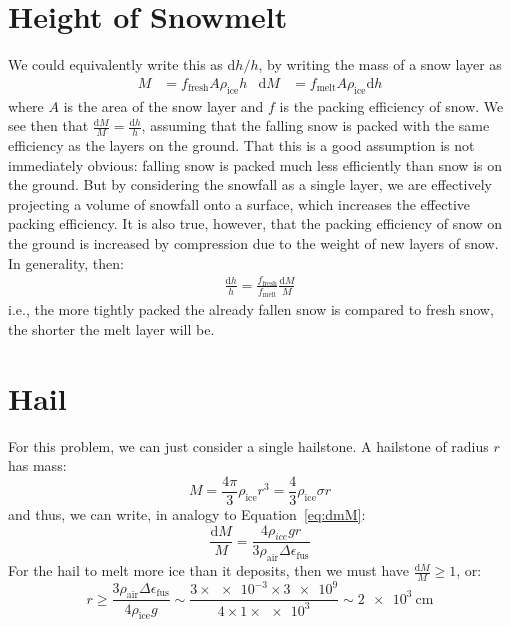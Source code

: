 \documentclass{article}
\begin{document}
    \section{Height of Snowmelt}
    We could equivalently write this as d$h/h$, by writing the mass of a snow layer as
    \begin{align}
        M &= f_\mathrm{fresh}A\rho_\mathrm{ice}h & \mathrm{d}M &= f_\mathrm{melt}A\rho_\mathrm{ice}\mathrm{d}h
    \end{align}
    where $A$ is the area of the snow layer and $f$ is the packing efficiency of snow.  We see then that $\frac{\mathrm{d}M}{M}=\frac{\mathrm{d}h}{h}$, assuming that the falling snow is packed with the same efficiency as the layers on the ground.  That this is a good assumption is not immediately obvious: falling snow is packed much less efficiently than snow is on the ground.  But by considering the snowfall as a single layer, we are effectively projecting a volume of snowfall onto a surface, which increases the effective packing efficiency.  It is also true, however, that the packing efficiency of snow on the ground is increased by compression due to the weight of new layers of snow.  In generality, then:
    \begin{align}
        \frac{\mathrm{d}h}{h} = \frac{f_{\mathrm{fresh}}}{f_\mathrm{melt}}\frac{\mathrm{d}M}{M}
    \end{align}
    i.e., the more tightly packed the already fallen snow is compared to fresh snow, the shorter the melt layer will be.
    
    \section{Hail}
    For this problem, we can just consider a single hailstone.  A hailstone of radius $r$ has mass:
    \begin{equation}
        M = \frac{4\pi}{3}\rho_{\mathrm{ice}}r^{3} = \frac{4}{3}\rho_{\mathrm{ice}}\sigma r
    \end{equation}
    and thus, we can write, in analogy to Equation~\eqref{eq:dmM}:
    \begin{equation}
        \frac{\mathrm{d}M}{M} = \frac{4\rho_{ice}gr}{3\rho_{\mathrm{air}}\Delta\epsilon_{\mathrm{fus}}}
    \end{equation}
    For the hail to melt more ice than it deposits, then we must have $\frac{\mathrm{d}M}{M}\geq1$, or:
    \begin{equation}
        r\geq\frac{3\rho_{\mathrm{air}}\Delta\epsilon_{\mathrm{fus}}}{4\rho_{\mathrm{ice}}g}\sim\frac{3\times\num{e-3}\times\num{3e9}}{4\times 1\times\num{e3}}\sim \SI{2e3}{\cm}
    \end{equation}
    
    
\end{document}
